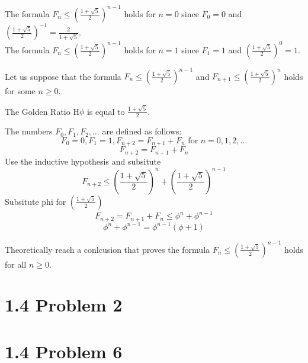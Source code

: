 \documentclass{report}
\begin{document}
\begin{basecaseWithPoppy}
    The formula $F_{n} \leq \left(\frac{1 + \sqrt{5}}{2}\right)^{n-1}$ holds for \( n = 0 \) since \( F_{0} = 0 \) and \( \left(\frac{1 + \sqrt{5}}{2}\right)^{-1} = \frac{2}{1 + \sqrt{5}} \).  \\
    The formula $F_{n} \leq \left(\frac{1 + \sqrt{5}}{2}\right)^{n-1}$ holds for \( n = 1 \) since \( F_{1} = 1 \) and \( \left(\frac{1 + \sqrt{5}}{2}\right)^{0} = 1 \). 
\end{basecaseWithPoppy}

\begin{inducthypWithRose}
    Let us suppose that the formula $F_{n} \leq \left(\frac{1 + \sqrt{5}}{2}\right)^{n-1}$ and $F_{n+1} \leq \left(\frac{1 + \sqrt{5}}{2}\right)^{n}$ holds for some \( n \geq 0 \).
\end{inducthypWithRose}    

\begin{RemarkWithLily}{The Golden Ratio}
   H$\phi$ is equal to $\frac{1 + \sqrt{5}}{2}$.    
\end{RemarkWithLily}

\begin{inductstepWithTulip}

    The numbers $F_{0}, F_{1}, F_{2}, \ldots$ are defined as follows:
        \[ F_{0} = 0, F_{1} = 1, F_{n+2} = F_{n+1} + F_{n} \text{ for } n = 0,1,2, \ldots \]
    \[ F_{n + 2} = F_{n+1} + F_{n} \]
    Use the inductive hypothesis and subsitute  
    \[ F_{n + 2} \leq \left(\frac{1 + \sqrt{5}}{2}\right)^{n} + \left(\frac{1 + \sqrt{5}}{2}\right)^{n-1}\]     
    Subsitute phi for \(\left(\frac{1 + \sqrt{5}}{2}\right)\)
    \[ F_{n + 2} = F_{n+1} + F_{n} \leq \phi^{n} + \phi^{n-1}\] 
    \[ \phi^{n}+ \phi^{n-1} = \phi^{n-1}(\phi + 1) \] 

\end{inductstepWithTulip}

\begin{keyideaWithLotus}
    Theoretically reach a conlcusion that proves the formula $F_{n} \leq \left(\frac{1 + \sqrt{5}}{2}\right)^{n-1}$ holds for all \( n \geq 0 \).
\end{keyideaWithLotus}


\section*{1.4 Problem 2}


\section*{1.4 Problem 6}

\end{document}
